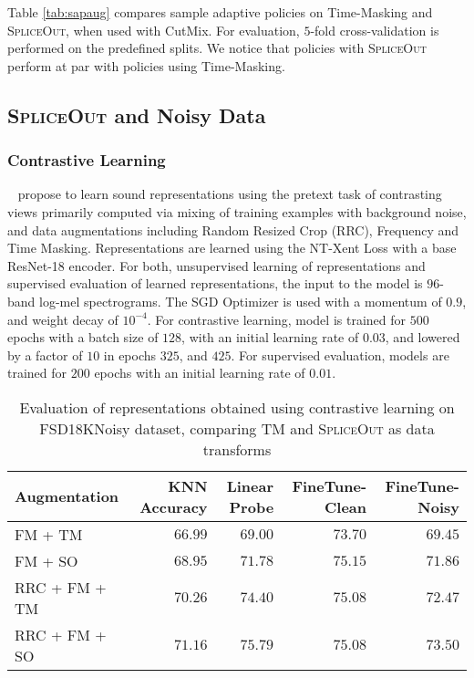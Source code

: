 \documentclass{article}
\newcommand{\SpA}{{\textsc{SpliceOut}}\xspace}
\begin{document}
Table \ref{tab:sapaug} compares sample adaptive policies on Time-Masking and \SpA, when used with CutMix. For evaluation, $5$-fold cross-validation is performed on the predefined splits. We notice that policies with \SpA perform at par with policies using Time-Masking. 
\subsection{\SpA and Noisy Data}

\subsubsection{Contrastive Learning}
~\citep{ucl} propose to learn sound representations using the pretext task of contrasting views primarily computed via mixing of training examples with background noise, and data augmentations including Random Resized Crop (RRC), Frequency and Time Masking. Representations are learned using the NT-Xent Loss with a base ResNet-18 encoder. For both, unsupervised learning of representations and supervised evaluation of learned representations, the input to the model is $96$-band log-mel spectrograms. The SGD Optimizer is used with a momentum of $0.9$, and weight decay of $10^{-4}$. For contrastive learning, model is trained for $500$ epochs with a batch size of $128$, with an initial learning rate of $0.03$, and lowered by a factor of $10$ in epochs $325$, and $425$. For supervised evaluation, models are trained for $200$ epochs with an initial learning rate of $0.01$. 

\begin{table}[h]
    \centering
    \caption{Evaluation of representations obtained using contrastive learning on FSD18KNoisy dataset, comparing TM and \SpA as data transforms}
    \begin{tabular}{lrrrr}
    \toprule
    Augmentation & KNN Accuracy & Linear Probe & FineTune-Clean & FineTune-Noisy\\
    \midrule
         FM + TM~\citep{ucl,specaugment} &  $66.99$ & $69.00$ & $73.70$ & $69.45$\\
         FM + SO & $\mathbf{68.95}$ & $\mathbf{71.78}$ & $\mathbf{75.15}$ & $\mathbf{71.86}$\\ 
    \midrule
      RRC +  FM + TM~\citep{ucl} &  $70.26$ & $74.40$ & $\mathbf{75.08}$ & $72.47$\\
      RRC +  FM + SO & $\mathbf{71.16}$ & $\mathbf{75.79}$ & $\mathbf{75.08}$ & $\mathbf{73.50}$\\ 
    \bottomrule
    \end{tabular}
    \label{tab:ucl}
\end{table}
\end{document}
